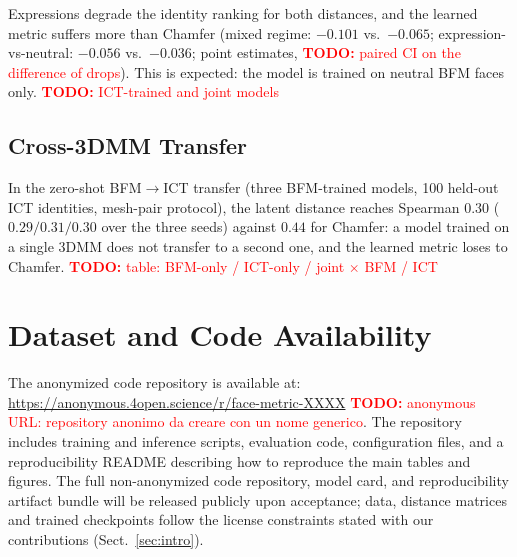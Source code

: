 \documentclass[10pt,twocolumn,letterpaper]{article}
\newcommand{\todo}[1]{\textcolor{red}{\textbf{TODO:} #1}}
\begin{document}
Expressions degrade the identity ranking for both distances, and the learned metric suffers more than Chamfer (mixed regime: $-0.101$ vs.\ $-0.065$; expression-vs-neutral: $-0.056$ vs.\ $-0.036$; point estimates, \todo{paired CI on the difference of drops}). This is expected: the model is trained on neutral BFM faces only. \todo{ICT-trained and joint models}

\subsection{Cross-3DMM Transfer}
\label{sec:cross3dmm}
In the zero-shot BFM$\rightarrow$ICT transfer (three BFM-trained models, 100 held-out ICT identities, mesh-pair protocol), the latent distance reaches Spearman $0.30$ ($0.29/0.31/0.30$ over the three seeds) against $0.44$ for Chamfer: a model trained on a single 3DMM does not transfer to a second one, and the learned metric loses to Chamfer. \todo{table: BFM-only / ICT-only / joint $\times$ BFM / ICT}

\section{Dataset and Code Availability}
\label{sec:availability}

The anonymized code repository is available at:
\url{https://anonymous.4open.science/r/face-metric-XXXX} \todo{anonymous URL: repository anonimo da creare con un nome generico}.
The repository includes training and inference scripts, evaluation code,
configuration files, and a reproducibility README describing how to reproduce the
main tables and figures. The full non-anonymized code repository, model card,
and reproducibility artifact bundle will be released publicly upon acceptance; data, distance matrices and trained
checkpoints follow the license constraints stated with our contributions (Sect.~\ref{sec:intro}).
\end{document}

